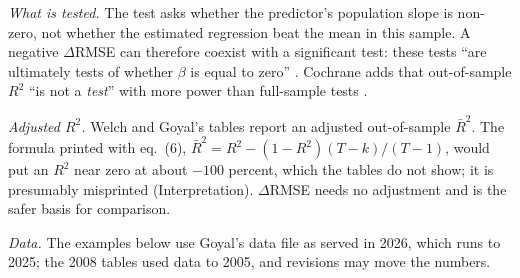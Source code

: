 \begin{qfmethod}
\emph{What is tested.} The test asks whether the predictor's population slope is non-zero, not whether the estimated regression beat the mean in this sample. A negative $\Delta$RMSE can therefore coexist with a significant test: these tests ``are ultimately tests of whether $\beta$ is equal to zero'' \citep[p.~1462, n.~3]{s7-welch}. Cochrane adds that out-of-sample $R^2$ ``is not a \emph{test}'' with more power than full-sample tests \citep[p.~1538]{wide-cochrane-dog}.

\emph{Adjusted $R^2$.} Welch and Goyal's tables report an adjusted out-of-sample $\bar R^2$. The formula printed with eq.~(6), $\bar R^2=R^2-(1-R^2)(T-k)/(T-1)$, would put an $R^2$ near zero at about $-100$ percent, which the tables do not show; it is presumably misprinted (Interpretation). $\Delta$RMSE needs no adjustment and is the safer basis for comparison.

\emph{Data.} The examples below use Goyal's data file as served in 2026, which runs to 2025; the 2008 tables used data to 2005, and revisions may move the numbers.


\end{qfmethod}
